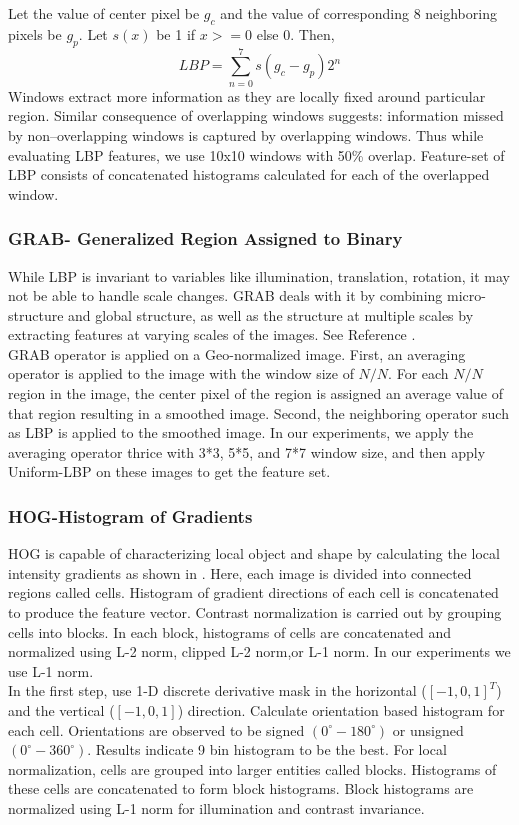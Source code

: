 \documentclass[english, 12pt]{article}
\begin{document}
\tab Let the value of center pixel be $g_c$ and the value of corresponding 8 neighboring pixels be $g_p$. Let $s(x)$ be 1 if $x >= 0$ else 0. Then,
\\
$$LBP = \sum_{n=0}^{7} s(g_c - g_p)2^n $$
\tab Windows extract more information as they are locally fixed around particular region. Similar consequence of overlapping windows suggests: information missed by non–overlapping windows is captured by overlapping windows. Thus while evaluating LBP features, we use 10x10 windows with 50\% overlap. Feature-set of LBP consists of concatenated histograms calculated for each of the overlapped window.

\subsubsection{GRAB- Generalized Region Assigned to Binary}
\tab While LBP is invariant to variables like illumination, translation, rotation, it may not be able to handle scale changes. GRAB deals with it by combining micro-structure and global structure, as well as the structure at multiple scales by extracting features at varying scales of the images. See Reference \cite{Sapkota2013}.
\\
\tab GRAB operator is applied on a Geo-normalized image. First, an averaging operator is applied to the image with the window size of $N/N$. For each $N/N$ region in the image, the center pixel of the region is assigned an average value of that region resulting in a smoothed image. Second, the neighboring operator such as LBP is applied to the smoothed image. In our experiments, we apply the averaging operator thrice with 3*3, 5*5, and 7*7 window size, and then apply Uniform-LBP on these images to get the feature set. 

\subsubsection{HOG-Histogram of Gradients}
\tab HOG is capable of characterizing local object and shape by calculating the local intensity gradients as shown in \cite{Dalal05histogramsof}. Here, each image is divided into connected regions called cells. Histogram of gradient directions of each cell is concatenated to produce the feature vector. Contrast normalization is carried out by grouping cells into blocks. In each block, histograms of cells are concatenated and normalized using L-2 norm, clipped L-2 norm,or L-1 norm. In our experiments we use L-1 norm. 
\\
\tab In the first step, use 1-D discrete derivative mask in the horizontal ($[-1, 0, 1]^T$) and the vertical ($[-1, 0, 1]$) direction. Calculate orientation based histogram for each cell. Orientations are observed to be signed $(0^{\circ}-180^{\circ})$ or unsigned  $(0^{\circ}-360^{\circ})$. Results indicate 9 bin histogram to be the best. For local normalization, cells are grouped into larger entities called blocks.
Histograms of these cells are concatenated to form block histograms. Block histograms are normalized using L-1 norm for illumination and contrast invariance.
\end{document}
